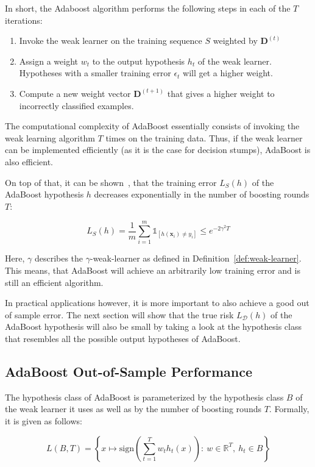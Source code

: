 In short, the Adaboost algorithm performs the following steps in each of the $T$ iterations:
\begin{enumerate}
    \item Invoke the weak learner on the training sequence $S$ weighted by $\mathbf{D}^{(t)}$
    \item Assign a weight $w_t$ to the output hypothesis $h_t$ of the weak learner. Hypotheses with a smaller
        training error $\epsilon_t$ will get a higher weight.
    \item Compute a new weight vector $\mathbf{D}^{(t+1)}$ that gives a higher weight to incorrectly classified
        examples.
\end{enumerate}

The computational complexity of AdaBoost essentially consists of invoking the weak learning algorithm $T$ times on
the training data. Thus, if the weak learner can be implemented efficiently (as it is the case for decision stumps),
AdaBoost is also efficient.

On top of that, it can be shown~\cite{SSBD14}, 
that the training error $L_S(h)$ of the AdaBoost hypothesis $h$ decreases exponentially
in the number of boosting rounds $T$:
\begin{linenomath*}
    $$
    L_S(h) = \frac{1}{m} \sum_{i=1}^m \mathds{1}_{\left[ h(\mathbf{x}_i) \neq y_i \right]} \leq e^{-2 \gamma^2 T}
    $$
\end{linenomath*}
Here, $\gamma$ describes the $\gamma$-weak-learner as defined in Definition~\ref{def:weak-learner}.
This means, that AdaBoost will achieve an arbitrarily low training error and is still an efficient algorithm.

In practical applications however, it is more important to also achieve a good out of sample error. The next section will
show that the true risk $L_\mathcal{D}(h)$ of the AdaBoost hypothesis will also be small by taking a look at the
hypothesis class that resembles all the possible output hypotheses of AdaBoost.

\subsection{AdaBoost Out-of-Sample Performance}

The hypothesis class of AdaBoost is parameterized by the hypothesis class $B$ of the weak learner it uses as well as by
the number of boosting rounds $T$. Formally, it is given as follows:
\begin{linenomath*}
    $$
    L(B, T) = \left \{ x \mapsto \text{sign} \left( \sum_{t=1}^T w_t h_t(x) \right): \ 
        w \in \mathbb{R}^T, \  h_t \in B \right \}
    $$
\end{linenomath*}

